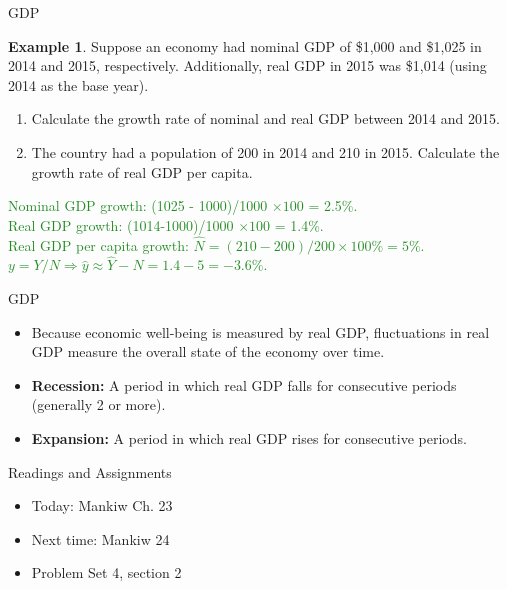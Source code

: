 \documentclass[xcolor={dvipsnames},pdf, hyperref={colorlinks=true, citecolor=ForestGreen, linkcolor=BlueViolet, urlcolor=Magenta}]{beamer}
\theoremstyle{definition}
\newtheorem{exmp}{Example}[section]
\newcommand{\defn}[1]{\textbf{#1}}
\newcommand{\ddp}[1]{{\textcolor{ForestGreen}{#1}}}
\begin{document}
\begin{frame}{GDP}

	\begin{exmp} 
		\scriptsize
		Suppose an economy had nominal GDP of \$1,000 and \$1,025 in 2014 and 2015, respectively. Additionally, real GDP in 2015 was \$1,014 (using 2014 as the base year). 
		\begin{enumerate}
			\item Calculate the growth rate of nominal and real GDP between 2014 and 2015. 
			\item The country had a population of 200 in 2014 and 210 in 2015. Calculate the growth rate of real GDP per capita.
		\end{enumerate}
	\end{exmp}
	\scriptsize
	\ddp{\pause Nominal GDP growth: (1025 - 1000)/1000 $\times 100$ = 2.5\%. \\
		\pause Real GDP growth: (1014-1000)/1000 $\times 100$ = 1.4\%. \\
		\pause Real GDP per capita growth: $\hat{N} = (210 - 200)/200 \times 100\% = 5\%.$ \\
		$y = Y/N \Rightarrow \hat{y}\approx \hat{Y} - \hat{N} = 1.4 - 5 = -3.6\%$. }
\end{frame}

\begin{frame}{GDP}
\begin{itemize}
	\item Because economic well-being is measured by real GDP, fluctuations in real GDP measure the overall state of the economy over time.
	\item \defn{Recession:} A period in which real GDP falls for consecutive periods (generally 2 or more).
	\item \defn{Expansion:} A period in which real GDP rises for consecutive periods.
\end{itemize}
\end{frame}



\begin{frame}{Readings and Assignments}
\begin{itemize}
	\item Today: Mankiw Ch. 23
	\item Next time: Mankiw 24
	\item Problem Set 4, section 2
\end{itemize}
\end{frame}
\end{document}
